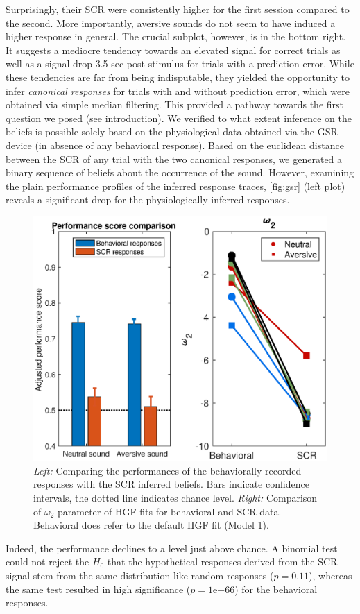 \documentclass{article}
\begin{document}
\begin{multicols}{2}
Surprisingly, their SCR were consistently higher for the first session compared to the second. More importantly, aversive sounds do not seem to have induced a higher response in general. The crucial subplot, however, is in the bottom right. It suggests a mediocre tendency towards an elevated signal for correct trials as well as a signal drop 3.5 sec post-stimulus for trials with a prediction error. While these tendencies are far from being indisputable, they yielded the opportunity to infer \textit{canonical responses} for trials with and without prediction error, which were obtained via simple median filtering. This provided a pathway towards the first question we posed (see \hyperref[sec:intro]{introduction}). We verified to what extent inference on the beliefs is possible solely based on the physiological data obtained via the GSR device (in absence of any behavioral response). Based on the euclidean distance between the SCR of any trial with the two canonical responses, we generated a binary sequence of beliefs about the occurrence of the sound. However, examining the plain performance profiles of the inferred response traces, \autoref{fig:gsr} (left plot) reveals a significant drop for the physiologically inferred responses.
\begin{figure}[H]
\hspace{-0.7cm}
  \includegraphics[width=.55\textwidth]{gsr}
  \caption{\textit{Left:} Comparing the performances of the behaviorally recorded responses with the SCR inferred beliefs. Bars indicate confidence intervals, the dotted line indicates chance level. \textit{Right:} Comparison of $\omega_2$ parameter of HGF fits for behavioral and SCR data. Behavioral does refer to the default HGF fit (Model 1).}
  \label{fig:gsr}
\end{figure}
\vspace{-5mm}
Indeed, the performance declines to a level just above chance. A binomial test could not reject the $H_0$ that the hypothetical responses derived from the SCR signal
stem from the same distribution like random responses ($p=0.11$), whereas the same test resulted in high significance ($p=1\mathrm{e}{-66}$) for the behavioral responses. 


\end{multicols}
\end{document}
